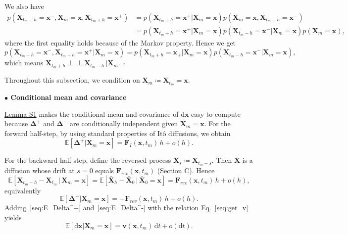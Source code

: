 \documentclass[
 longbibliography,
 twocolumn,
 superscriptaddress,
 amsmath,
 amssymb,
 amsthm,
 amsfonts,
 prl,
 floatfix,
]{revtex4-2}
\begin{document}
\begin{widetext}
We also have
\begin{align*}
    p(\bm{X}_{t_m-h}=\bm{x}^-,\bm{X}_m=\bm{x},\bm{X}_{t_m+h}=\bm{x}^+)
    &=p(\bm{X}_{t_m+h}=\bm{x}^+|\bm{X}_m=\bm{x})p(\bm{X}_{m}=\bm{x},\bm{X}_{t_m-h}=\bm{x}^-)
    \\
    &=p(\bm{X}_{t_m+h}=\bm{x}^+|\bm{X}_m=\bm{x})p(\bm{X}_{t_m-h}=\bm{x}^-|\bm{X}_m=\bm{x})p(\bm{X}_{m}=\bm{x}),
\end{align*}
where the first equality holds because of the Markov property. Hence we get 
\begin{equation*}
    p(\bm{X}_{t_m-h}=\bm{x}^-,\bm{X}_{t_m+h}=\bm{x}^+|\bm{X}_m=\bm{x})=p(\bm{X}_{t_m+h}=\bm{x_+}|\bm{X}_m=\bm{x})p(\bm{X}_{t_m-h}=\bm{x}^-|\bm{X}_m=\bm{x}),
\end{equation*}
which means $\bm{X}_{t_m+h}\perp\!\!\!\perp\bm{X}_{t_m-h}\,|\bm{X}_m$. $\square$

Throughout this subsection, we condition on $\bm{X}_m \coloneq\bm{X}_{t_m}= \bm{x}$.

\bigskip
\noindent\textbf{$\bullet$ Conditional mean and covariance}

\hyperlink{lem:S1}{Lemma S1} makes the conditional mean and covariance of $\mathrm{d}\bm{x}$ easy to compute because $\bm\Delta^+$ and $\bm\Delta^-$ are conditionally independent given $\bm{X}_m=\bm{x}$.
For the forward half-step, by using standard properties of It\^{o} diffusions, we obtain
\begin{equation}
    \mathbb{E}[\bm\Delta^+|\bm{X}_m=\bm{x}]=
    \bm{F}_I(\bm{x},t_m)\,h+o(h).
    \label{seq:E_Delta^+}
\end{equation}

For the backward half-step, define the reversed process $\bar{\bm{X}}_s\coloneq\bm{X}_{t_m-s}$. Then $\bar{\bm{X}}$ is a diffusion whose drift at $s=0$ equals $\bm{F}_{rev}(\bm{x},t_m)$ (Section C). Hence
\begin{equation*}
    \mathbb{E}\left[
    \bm{X}_{t_m-h}-\bm{X}_{t_m}\,|\,\bm{X}_m=\bm{x}
    \right]=
    \mathbb{E}\left[
    \bar{\bm{X}}_h-\bar{\bm{X}}_0\,|\,\bar{\bm{X}}_0=\bm{x}
    \right]=\bm{F}_{rev}(\bm{x},t_m)\,h+o(h),
\end{equation*}
equivalently 
\begin{equation}
    \mathbb{E}\left[\bm\Delta^-|\bm{X}_m=\bm{x}\right]=-\bm{F}_{rev}(\bm{x},t_m)\,h+o(h).
    \label{seq:E_Delta^-}
\end{equation} 
Adding~\eqref{seq:E_Delta^+} and~\eqref{seq:E_Delta^-} with the relation Eq.~\eqref{seq:get_v} yields
\begin{equation}
    \mathbb{E}[\mathrm{d}\bm{x}|\bm{X}_m=\bm{x}]=\bm{v}(\bm{x},t_m)\,\mathrm{d}t+o(\mathrm{d}t).
    \label{seq:cal_dx_xm}
\end{equation}


\end{widetext}
\end{document}
